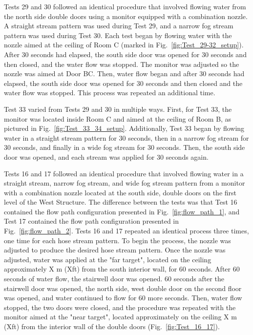 \documentclass[12pt,oneside]{book}
\begin{document}
Tests 29 and 30 followed an identical procedure that involved flowing water from the north side double doors using a monitor equipped with a combination nozzle. A straight stream pattern was used during Test 29, and a narrow fog stream pattern was used during Test 30. Each test began by flowing water with the nozzle aimed at the ceiling of Room C (marked in Fig.~\ref{fig:Test_29-32_setup}). After 30 seconds had elapsed, the south side door was opened for 30 seconds and then closed, and the water flow was stopped. The monitor was adjusted so the nozzle was aimed at Door BC. Then, water flow began and after 30 seconds had elapsed, the south side door was opened for 30 seconds and then closed and the water flow was stopped. This process was repeated an additional time. 

Test 33 varied from Tests 29 and 30 in multiple ways. First, for Test 33, the monitor was located inside Room C and aimed at the ceiling of Room B, as pictured in Fig.~\ref{fig:Test_33_34_setup}. Additionally, Test 33 began by flowing water in a straight stream pattern for 30 seconds, then in a narrow fog stream for 30 seconds, and finally in a wide fog stream for 30 seconds. Then, the south side door was opened, and each stream was applied for 30 seconds again.

Tests 16 and 17 followed an identical procedure that involved flowing water in a straight stream, narrow fog stream, and wide fog stream pattern from a monitor with a combination nozzle located at the south side, double doors on the first level of the West Structure. The difference between the tests was that Test 16 contained the flow path configuration presented in Fig.~\ref{fig:flow_path_1}, and Test 17 contained the flow path configuration presented in Fig.~\ref{fig:flow_path_2}. Tests 16 and 17 repeated an identical process three times, one time for each hose stream pattern. To begin the process, the nozzle was adjusted to produce the desired hose stream pattern. Once the nozzle was adjusted, water was applied at the "far target", located on the ceiling approximately X m (Xft) from the south interior wall, for 60 seconds. After 60 seconds of water flow, the stairwell door was opened. 60 seconds after the stairwell door was opened, the north side, west double door on the second floor was opened, and water continued to flow for 60 more seconds. Then, water flow stopped, the two doors were closed, and the procedure was repeated with the monitor aimed at the "near target", located approximately on the ceiling X m (Xft) from the interior wall of the double doors (Fig.~\ref{fig:Test_16_17}).
\end{document}
